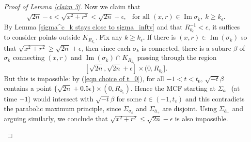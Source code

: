 \documentclass[10pt,a4paper]{amsart}
\begin{document}
\begin{proof} [Proof of Lemma \ref{claim 3}]
			Now we claim that 
			\begin{align} \label{Hausdorff converges to round sphere eqn}
				\sqrt{2n}-\epsilon<\sqrt{x^2+r^2}<\sqrt{2n}+\epsilon, \ \ \text{ for all }(x,r)\in \operatorname{Im}\sigma_k, \ k\ge k_\epsilon.
			\end{align}
			By Lemma \ref{sigma^c_k stays close to sigma_infty} and that $R_{k_\epsilon}^{-1}<\epsilon$, it suffices to consider points outside $K_{R_{k_\epsilon}}$. Fix any $k\ge k_\epsilon$. If there is $(x,r)\in \operatorname{Im}(\sigma_k)$ so that $\sqrt{x^2+r^2} \ge \sqrt{2n} +\epsilon$, then since each $\sigma_k$ is connected, there is a subarc $\beta$ of $\sigma_k$ connecting $(x,r)$ and $\operatorname{Im} (\sigma_k) \cap K_{R_{k_\epsilon}}$ passing through the region 
			\[ [\sqrt{2n}, \sqrt{2n} +\epsilon] \times (0,R_{k_\epsilon}].\] 
			But this is impossible: by (\ref{eqn choice of t_0}), for all $-1<t<t_0$, $\sqrt{-t}\beta$ contains a point $\{\sqrt{2n} + 0.5\epsilon\} \times (0,R_{k_\epsilon})$. Hence the MCF starting at $\Sigma_{\bar a_+}$ (at time $-1$) would intersect with $\sqrt{-t}\beta$ for some $t\in (-1, t_e)$ and this contradicts the parabolic maximum principle, since $\Sigma_{\sigma_k}$ and $\Sigma_{\bar a_+}$ are disjoint. Using $\Sigma_{\bar a_-}$ and arguing similarly, we conclude that $\sqrt{x^2+r^2}\le \sqrt{2n}-\epsilon$ is also impossible. 
			\begin{figure}[ht]
				
				\begin{tikzpicture}[x=0.75pt,y=0.75pt,yscale=-1,xscale=1]
					

\end{tikzpicture}
\end{figure}
\end{proof}
\end{document}
